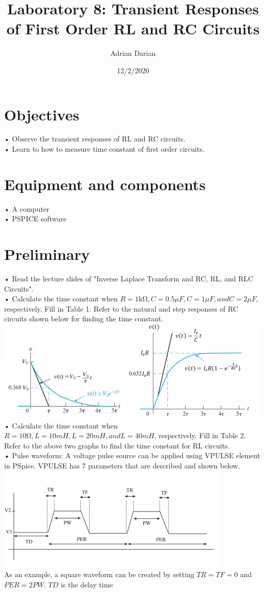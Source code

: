 \documentclass[a4paper]{article}
\title{Laboratory 8: Transient Responses of First Order RL and RC Circuits}
\author{Adrian Darian}
\date{12/2/2020}
\begin{document}
  
\maketitle
  
\section*{Objectives}
• Observe the transient responses of RL and RC circuits. \\
• Learn to how to measure time constant of first order circuits. \\

\section*{Equipment and components}
• A computer \\
• PSPICE software \\

\section*{Preliminary}
• Read the lecture slides of "Inverse Laplace Transform and RC, RL, and RLC Circuits".\\
• Calculate the time constant when $R = 1 \si{\kilo\ohm}, C = 0.5 \si{\mu}F, C = 1 \si{\mu}F, and C = 2 \si{\mu}F$, respectively. Fill in Table 1. Refer to the natural and step responses of RC circuits shown below for finding the time constant. \\
\includegraphics[scale=0.5]{image-1.png} \\
• Calculate the time constant when $R = 10 \si{\ohm}, L = 10 mH, L = 20 mH, and L = 40 mH$, respectively. Fill in Table 2. Refer to the above two graphs to find the time constant for RL circuits. \\
• Pulse waveform: A voltage pulse source can be applied using VPULSE element in PSpice. VPULSE has 7 parameters that are described and shown below. \\
\includegraphics[scale=0.5]{image-2.png} \\
As an example, a square waveform can be created by setting $TR = TF = 0$ and $PER = 2 PW$. $TD$ is the delay time \\
\end{document}
